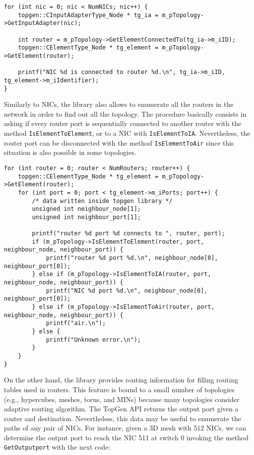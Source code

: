 \documentclass[12pt,onecolumn]{report}
\begin{document}
\begin{lstlisting}
for (int nic = 0; nic < NumNICs; nic++) {
    topgen::CInputAdapterType_Node * tg_ia = m_pTopology->GetInputAdapter(nic);

    int router = m_pTopology->GetElementConnectedTo(tg_ia->m_iID);
    topgen::CElementType_Node * tg_element = m_pTopology->GetElement(router);

    printf("NIC %d is connected to router %d.\n", tg_ia->m_iID, tg_element->m_iIdentifier);
}
\end{lstlisting}


Similarly to NICs, the library also allows to enumerate all the routers in the network in order to find out all the topology. The procedure basically consists in asking if every router port is sequentially connected to another router with the method \verb|IsElementToElement|, or to a NIC with \verb|IsElementToIA|. Nevertheless, the router port can be disconnected with the method \verb|IsElementToAir| since this situation is also possible in some topologies.

\begin{lstlisting}
for (int router = 0; router < NumRouters; router++) {
	topgen::CElementType_Node * tg_element = m_pTopology->GetElement(router);
	for (int port = 0; port < tg_element->m_iPorts; port++) {
		/* data written inside topgen library */
		unsigned int neighbour_node[1];
		unsigned int neighbour_port[1];
		
		printf("router %d port %d connects to ", router, port);
		if (m_pTopology->IsElementToElement(router, port, neighbour_node, neighbour_port)) {
			printf("router %d port %d.\n", neighbour_node[0], neighbour_port[0]);
		} else if (m_pTopology->IsElementToIA(router, port, neighbour_node, neighbour_port)) {
			printf("NIC %d port %d.\n", neighbour_node[0], neighbour_port[0]);
		} else if (m_pTopology->IsElementToAir(router, port, neighbour_node, neighbour_port)) {
			printf("air.\n");
		} else {
			printf("Unknown error.\n");
		}
	}
}
\end{lstlisting}

On the other hand, the library provides routing information for filling routing tables used in routers. This feature is bound to a small number of topologies (e.g., hypercubes, meshes, torus, and MINs) because many topologies consider adaptive routing algorithm. The TopGen API returns the output port given a router and destination. Nevertheless, this data may be useful to enumerate the paths of any pair of NICs. For instance, given a 3D mesh with 512 NICs, we can determine the output port to reach the NIC 511 at switch 0 invoking the method \verb|GetOutputport| with the next code:
\end{document}
